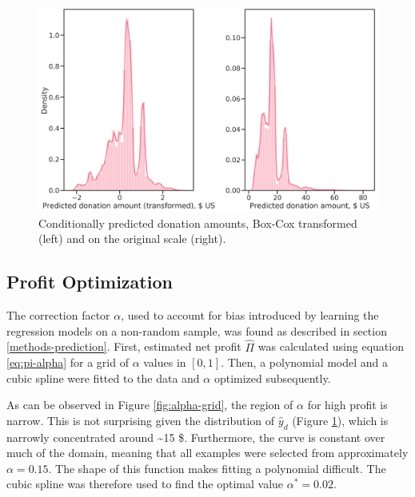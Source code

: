 \documentclass[
  11pt,
  a4paper,
  DIV=12,captions=tableheading,oneside,titlepage]{scrbook}
\begin{document}
\begin{figure}

{\centering \includegraphics[width=0.7\linewidth]{figures/predictions/hat_y_d-distributions-before-after-transformation} 

}

\caption{Conditionally predicted donation amounts, Box-Cox transformed (left) and on the original scale (right).}\label{fig:y-d-predict}
\end{figure}

\hypertarget{profit-optimization}{%
\subsection{Profit Optimization}\label{profit-optimization}}

The correction factor \(\alpha\), used to account for bias introduced by learning the regression models on a non-random sample, was found as described in section \ref{methods-prediction}. First, estimated net profit \(\hat{\Pi}\) was calculated using equation \eqref{eq:pi-alpha} for a grid of \(\alpha\) values in \([0,1]\). Then, a polynomial model and a cubic spline were fitted to the data and \(\alpha\) optimized subsequently.

As can be observed in Figure \ref{fig:alpha-grid}, the region of \(\alpha\) for high profit is narrow. This is not surprising given the distribution of \(\hat{y}_d\) (Figure \ref{fig:y-d-predict}), which is narrowly concentrated around \textasciitilde{}15 \$. Furthermore, the curve is constant over much of the domain, meaning that all examples were selected from approximately \(\alpha=0.15\). The shape of this function makes fitting a polynomial difficult. The cubic spline was therefore used to find the optimal value \(\alpha^*=0.02\).
\end{document}
